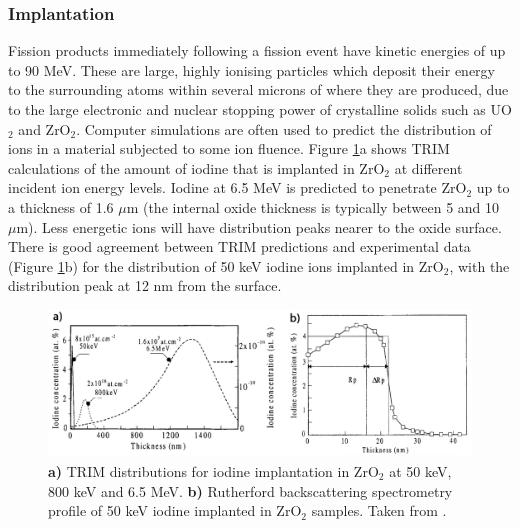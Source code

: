 \subsubsection{Implantation} \label{implantation}

Fission products immediately following a fission event have kinetic energies of up to 90 MeV. These are large, highly ionising particles which deposit their energy to the surrounding atoms within several microns of where they are produced, due to the large electronic and nuclear stopping power of crystalline solids such as UO$_{2}$ and ZrO$_{2}$. Computer simulations are often used to predict the distribution of ions in a material subjected to some ion fluence. Figure \ref{figure:srimtrim}a shows TRIM calculations of the amount of iodine that is implanted in ZrO$_{2}$ at different incident ion energy levels. Iodine at 6.5 MeV is predicted to penetrate ZrO$_{2}$ up to a thickness of 1.6 $\mu$m (the internal oxide thickness is typically between 5 and 10 $\mu$m). Less energetic ions will have distribution peaks nearer to the oxide surface. There is good agreement between TRIM predictions and experimental data (Figure \ref{figure:srimtrim}b) for the distribution of 50 keV iodine ions implanted in ZrO$_{2}$, with the distribution peak at 12 nm from the surface.

\begin{figure}[ht] %
\centering
\includegraphics[width=\linewidth]{images/srimtrim.png}
\caption[\textbf{a)} TRIM distributions for iodine implantation in ZrO$_{2}$ at 50 keV, 800 keV and 6.5 MeV. \textbf{b)} Rutherford backscattering spectrometry profile of 50 keV iodine implanted in ZrO$_{2}$ samples.]{\textbf{a)} TRIM distributions for iodine implantation in ZrO$_{2}$ at 50 keV, 800 keV and 6.5 MeV. \textbf{b)} Rutherford backscattering spectrometry profile of 50 keV iodine implanted in ZrO$_{2}$ samples. Taken from \cite{brossard1998use}.}
\label{figure:srimtrim}
\end{figure}

